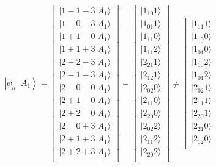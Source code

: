 \documentclass{article}
\begin{document}
\begin{equation}
\left| \psi_{n} \; \; A_{1} \right\rangle
=
\left[
\begin{array}{c}
	|1-1-3 \; A_{1}\rangle  \\
	|1\mspace{22mu}0-3\; A_{1}\rangle \\
	|1+1\mspace{22mu}0\; A_{1}\rangle \\
	|1+1+3\; A_{1}\rangle \\
	|2-2-3\; A_{1}\rangle \\
	|2-1-3\; A_{1}\rangle \\
	|2\mspace{22mu}0\mspace{22mu}0\; A_{1}\rangle \\
	|2+1\mspace{22mu}0\; A_{1}\rangle \\
	|2+2\mspace{22mu}0\; A_{1}\rangle \\
	|2\mspace{22mu}0+3\; A_{1}\rangle \\
	|2+1+3\; A_{1}\rangle \\
	|2+2+3\; A_{1}\rangle \\
\end{array}
\right]
=
\left[
\begin{array}{c}
	|1_{10}1\rangle  \\
	|1_{01}1\rangle \\
	|1_{11}0\rangle \\
	|1_{11}2\rangle \\
	|2_{21}1\rangle \\
	|2_{12}1\rangle \\
	|2_{02}0\rangle \\
	|2_{11}0\rangle \\
	|2_{20}0\rangle \\
	|2_{02}2\rangle \\
	|2_{11}2\rangle \\
	|2_{20}2\rangle \\
\end{array}
\right]
\neq
\left[
\begin{array}{c}
	|1_{11}1\rangle \\
	|1_{10}0\rangle \\
	|1_{01}0\rangle \\
	|1_{10}2\rangle \\
	|1_{01}2\rangle \\
	|2_{02}1\rangle \\
	|2_{11}1\rangle \\
	|2_{20}1\rangle \\
	|2_{21}0\rangle \\
	|2_{12}0\rangle \\

\end{array}
\end{equation}
\end{document}
